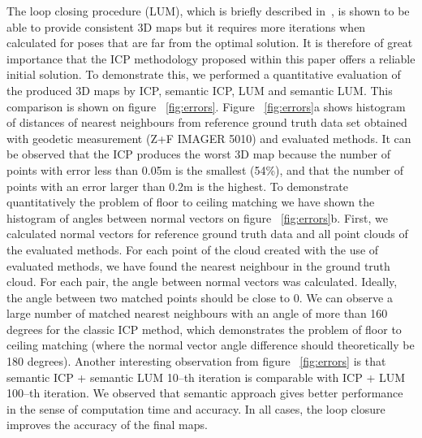 \documentclass{article}
\begin{document}
The loop closing procedure (LUM), which is briefly described in~\cite{Borrmann:2008:GCM:1342428.1342686}, is shown to be able to provide consistent 3D maps but it requires more iterations when calculated for poses that are far from the optimal solution. It is therefore of great importance that the ICP methodology proposed within this paper offers a reliable initial solution. To demonstrate this, we performed a quantitative evaluation of the produced 3D maps by ICP, semantic ICP, LUM and semantic LUM.
This comparison is shown on figure ~\ref{fig:errors}.
Figure ~\ref{fig:errors}a shows histogram of distances of nearest neighbours from reference ground truth data set obtained with geodetic measurement (Z+F IMAGER 5010) and evaluated methods.
It can be observed that the ICP produces the worst 3D map because the number of points with error less than 0.05m is the smallest (54\%), and that the number of points with an error larger than 0.2m is the highest.
To demonstrate quantitatively the problem of floor to ceiling matching we have shown the histogram of angles between normal vectors on figure ~\ref{fig:errors}b.
First, we calculated normal vectors for reference ground truth data and all point clouds of the evaluated methods.
For each point of the cloud created with the use of evaluated methods, we have found the nearest neighbour in the ground truth cloud. For each pair, the angle between normal vectors was calculated.
Ideally, the angle between two matched points should be close to 0.
We can observe a large number of matched nearest neighbours with an angle of more than 160 degrees for the classic ICP method, which demonstrates the problem of floor to ceiling matching (where the normal vector angle difference should theoretically be 180 degrees).
Another interesting observation from figure ~\ref{fig:errors} is that semantic ICP + semantic LUM 10--th iteration is comparable with ICP + LUM 100--th iteration.
We observed that semantic approach gives better performance in the sense of computation time and accuracy. In all cases, the loop closure improves the accuracy of the final maps.
\end{document}
